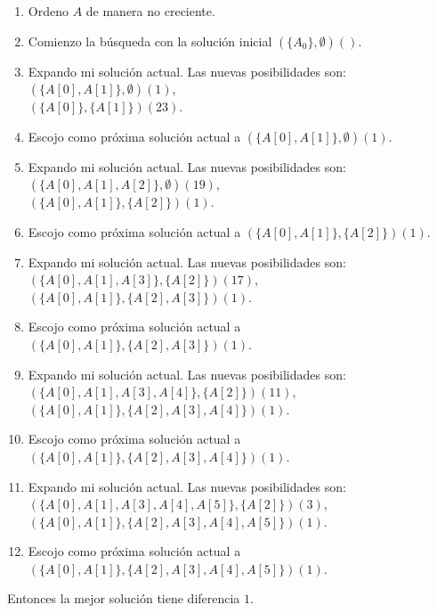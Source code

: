 \documentclass{article}
\begin{document}
\begin{enumerate}
\renewcommand{\labelenumii}{\arabic{enumii}.}

\begin{enumerate}

\item Ordeno $A$ de manera no creciente.

\item Comienzo la búsqueda con la solución inicial $(\{A_0\},\emptyset) ()$.

\item Expando mi solución actual. Las nuevas posibilidades son: \\
$(\{A[0],A[1]\},\emptyset) (1)$,\\
$(\{A[0]\},\{A[1]\}) (23)$.

\item Escojo como próxima solución actual a $(\{A[0],A[1]\},\emptyset) (1)$.

\item Expando mi solución actual. Las nuevas posibilidades son: \\
$(\{A[0],A[1],A[2]\},\emptyset) (19)$,\\
$(\{A[0],A[1]\},\{A[2]\}) (1)$.

\item Escojo como próxima solución actual a $(\{A[0],A[1]\},\{A[2]\}) (1)$.

\item Expando mi solución actual. Las nuevas posibilidades son: \\
$(\{A[0],A[1],A[3]\},\{A[2]\}) (17)$,\\
$(\{A[0],A[1]\},\{A[2],A[3]\}) (1)$.

\item Escojo como próxima solución actual a $(\{A[0],A[1]\},\{A[2],A[3]\}) (1)$.

\item Expando mi solución actual. Las nuevas posibilidades son: \\
$(\{A[0],A[1],A[3],A[4]\},\{A[2]\}) (11)$,\\
$(\{A[0],A[1]\},\{A[2],A[3],A[4]\}) (1)$.

\item Escojo como próxima solución actual a\\
$(\{A[0],A[1]\},\{A[2],A[3],A[4]\}) (1)$.

\item Expando mi solución actual. Las nuevas posibilidades son: \\
$(\{A[0],A[1],A[3],A[4],A[5]\},\{A[2]\}) (3)$,\\
$(\{A[0],A[1]\},\{A[2],A[3],A[4],A[5]\}) (1)$.

\item Escojo como próxima solución actual a \\
$(\{A[0],A[1]\},\{A[2],A[3],A[4],A[5]\}) (1)$.

\end{enumerate}

Entonces la mejor solución tiene diferencia $1$.

\end{enumerate}
\end{document}
